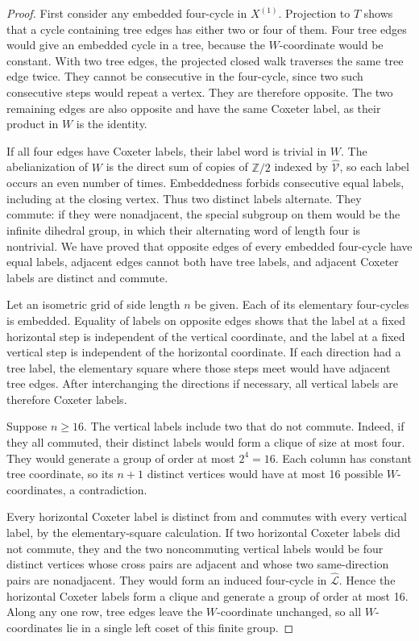 \begin{proof}
First consider any embedded four-cycle in \(X^{(1)}\).  Projection to
\(T\) shows that a cycle containing tree edges has either two or four
of them.  Four tree edges would give an embedded cycle in a tree,
because the \(W\)-coordinate would be constant.  With two tree edges,
the projected closed walk traverses the same tree edge twice.  They
cannot be consecutive in the four-cycle, since two such consecutive
steps would repeat a vertex.  They are therefore opposite.  The two
remaining edges are also opposite and have the same Coxeter label,
as their product in \(W\) is the identity.

If all four edges have Coxeter labels, their label word is trivial in
\(W\).  The abelianization of \(W\) is the direct sum of copies of
\(\mathbb Z/2\) indexed by \(\widehat{\mathcal V}\), so each label
occurs an even number of times.  Embeddedness forbids consecutive
equal labels, including at the closing vertex.  Thus two distinct
labels alternate.  They commute: if they were nonadjacent, the
special subgroup on them would be the infinite dihedral group, in
which their alternating word of length four is nontrivial.  We have
proved that opposite edges of every embedded four-cycle have equal
labels, adjacent edges cannot both have tree labels, and adjacent
Coxeter labels are distinct and commute.

Let an isometric grid of side length \(n\) be given.  Each of its
elementary four-cycles is embedded.  Equality of labels on opposite
edges shows that the label at a fixed horizontal step is independent
of the vertical coordinate, and the label at a fixed vertical step is
independent of the horizontal coordinate.  If each direction had a
tree label, the elementary square where those steps meet would have
adjacent tree edges.  After interchanging the directions if necessary,
all vertical labels are therefore Coxeter labels.

Suppose \(n\geq16\).  The vertical labels include two that do not
commute.  Indeed, if they all commuted, their distinct labels would
form a clique of size at most four.  They would generate a group of
order at most \(2^4=16\).  Each column has constant tree coordinate,
so its \(n+1\) distinct vertices would have at most 16 possible
\(W\)-coordinates, a contradiction.

Every horizontal Coxeter label is distinct from and commutes with
every vertical label, by the elementary-square calculation.  If two
horizontal Coxeter labels did not commute, they and the two
noncommuting vertical labels would be four distinct vertices whose
cross pairs are adjacent and whose two same-direction pairs are
nonadjacent.  They would form an induced four-cycle in
\(\widehat{\mathcal L}\).  Hence the horizontal Coxeter labels form a
clique and generate a group of order at most 16.  Along any one row,
tree edges leave the \(W\)-coordinate unchanged, so all
\(W\)-coordinates lie in a single left coset of this finite group.


\end{proof}
